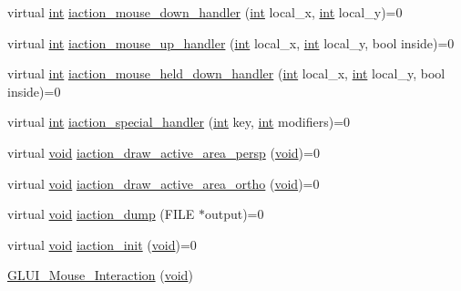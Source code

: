 \begin{DoxyCompactItemize}
\item 
virtual \hyperlink{wglext_8h_a500a82aecba06f4550f6849b8099ca21}{int} \hyperlink{class_g_l_u_i___mouse___interaction_ab4168e2ccfdb1a8afe2b220e53902b8d}{iaction\+\_\+mouse\+\_\+down\+\_\+handler} (\hyperlink{wglext_8h_a500a82aecba06f4550f6849b8099ca21}{int} local\+\_\+x, \hyperlink{wglext_8h_a500a82aecba06f4550f6849b8099ca21}{int} local\+\_\+y)=0
\item 
virtual \hyperlink{wglext_8h_a500a82aecba06f4550f6849b8099ca21}{int} \hyperlink{class_g_l_u_i___mouse___interaction_aaeab42a0986281d21e2b3ab24efb527d}{iaction\+\_\+mouse\+\_\+up\+\_\+handler} (\hyperlink{wglext_8h_a500a82aecba06f4550f6849b8099ca21}{int} local\+\_\+x, \hyperlink{wglext_8h_a500a82aecba06f4550f6849b8099ca21}{int} local\+\_\+y, bool inside)=0
\item 
virtual \hyperlink{wglext_8h_a500a82aecba06f4550f6849b8099ca21}{int} \hyperlink{class_g_l_u_i___mouse___interaction_ab10a2bbd829a80e7403d722e4e3b480d}{iaction\+\_\+mouse\+\_\+held\+\_\+down\+\_\+handler} (\hyperlink{wglext_8h_a500a82aecba06f4550f6849b8099ca21}{int} local\+\_\+x, \hyperlink{wglext_8h_a500a82aecba06f4550f6849b8099ca21}{int} local\+\_\+y, bool inside)=0
\item 
virtual \hyperlink{wglext_8h_a500a82aecba06f4550f6849b8099ca21}{int} \hyperlink{class_g_l_u_i___mouse___interaction_a738d6fd0afea5a76b45fe2a3c24c4e64}{iaction\+\_\+special\+\_\+handler} (\hyperlink{wglext_8h_a500a82aecba06f4550f6849b8099ca21}{int} key, \hyperlink{wglext_8h_a500a82aecba06f4550f6849b8099ca21}{int} modifiers)=0
\item 
virtual \hyperlink{wglext_8h_a9e6b7f1933461ef318bb000d6bd13b83}{void} \hyperlink{class_g_l_u_i___mouse___interaction_a4c7473fb5849e7d13052100aac56a9f3}{iaction\+\_\+draw\+\_\+active\+\_\+area\+\_\+persp} (\hyperlink{wglext_8h_a9e6b7f1933461ef318bb000d6bd13b83}{void})=0
\item 
virtual \hyperlink{wglext_8h_a9e6b7f1933461ef318bb000d6bd13b83}{void} \hyperlink{class_g_l_u_i___mouse___interaction_aba702d0d46375ab194c7b07d93051b0d}{iaction\+\_\+draw\+\_\+active\+\_\+area\+\_\+ortho} (\hyperlink{wglext_8h_a9e6b7f1933461ef318bb000d6bd13b83}{void})=0
\item 
virtual \hyperlink{wglext_8h_a9e6b7f1933461ef318bb000d6bd13b83}{void} \hyperlink{class_g_l_u_i___mouse___interaction_a99dd43b2224bbfee6aadee3cf15c1fdd}{iaction\+\_\+dump} (F\+I\+L\+E $\ast$output)=0
\item 
virtual \hyperlink{wglext_8h_a9e6b7f1933461ef318bb000d6bd13b83}{void} \hyperlink{class_g_l_u_i___mouse___interaction_a4be4e3ae7948824b2af30c2b87f434fd}{iaction\+\_\+init} (\hyperlink{wglext_8h_a9e6b7f1933461ef318bb000d6bd13b83}{void})=0
\item 
\hyperlink{class_g_l_u_i___mouse___interaction_aa694b34a9d008ec9f428cffd12c83653}{G\+L\+U\+I\+\_\+\+Mouse\+\_\+\+Interaction} (\hyperlink{wglext_8h_a9e6b7f1933461ef318bb000d6bd13b83}{void})
\end{DoxyCompactItemize}
